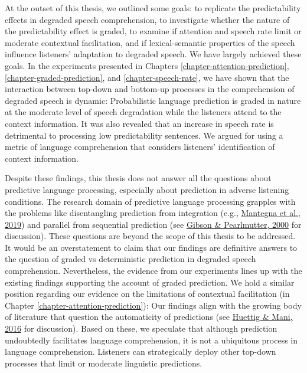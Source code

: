 \documentclass[a4paper, nobind]{templates/ociamthesis}
\begin{document}
At the outset of this thesis, we outlined some goals:
to replicate the predictability effects in degraded speech comprehension,
to investigate whether the nature of the predictability effect is graded,
to examine if attention and speech rate limit or moderate contextual facilitation,
and if lexical-semantic properties of the speech influence listeners' adaptation to degraded speech.
We have largely achieved these goals.
In the experiments presented in Chapters \ref{chapter-attention-prediction}, \ref{chapter-graded-prediction}, and \ref{chapter-speech-rate}, we have shown that the interaction between top-down and bottom-up processes in the comprehension of degraded speech is dynamic:
Probabilistic language prediction is graded in nature at the moderate level of speech degradation while the listeners attend to the context information.
It was also revealed that an increase in speech rate is detrimental to processing low predictability sentences.
We argued for using a metric of language comprehension that considers listeners' identification of context information.

Despite these findings, this thesis does not answer all the questions about predictive language processing, especially about prediction in adverse listening conditions.
The research domain of predictive language processing grapples with the problems like disentangling prediction from integration (e.g., \protect\hyperlink{ref-Mantegna2019}{Mantegna et al., 2019}) and
parallel from sequential prediction (see \protect\hyperlink{ref-Gibson2000}{Gibson \& Pearlmutter, 2000} for discussion).
These questions are beyond the scope of this thesis to be addressed.
It would be an overstatement to claim that our findings are definitive answers to the question of graded vs deterministic prediction in degraded speech comprehension.
Nevertheless, the evidence from our experiments lines up with the existing findings supporting the account of graded prediction.
We hold a similar position regarding our evidence on the limitations of contextual facilitation (in Chapter \ref{chapter-attention-prediction}):
Our findings align with the growing body of literature that question the automaticity of predictions (see \protect\hyperlink{ref-Huettig2016}{Huettig \& Mani, 2016} for discussion).
Based on these, we speculate that although prediction undoubtedly facilitates language comprehension,
it is not a ubiquitous process in language comprehension.
Listeners can strategically deploy other top-down processes that limit or moderate linguistic predictions.
\end{document}
